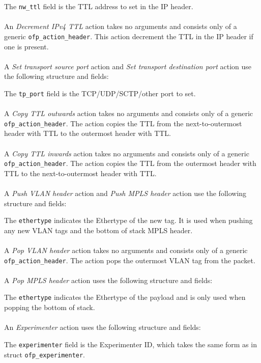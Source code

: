 
The \verb|nw_ttl| field is the TTL address to set in the IP header.
\\\\
An \emph{Decrement IPv4 TTL} action takes no arguments and consists only of a generic \verb|ofp_action_header|.  This action decrement the TTL in the IP header if one is present.
\\\\
A \emph{Set transport source port} action and \emph{Set transport destination port} action use the following structure and fields:


The \verb|tp_port| field is the TCP/UDP/SCTP/other port to set.
\\\\
A \emph{Copy TTL outwards} action takes no arguments and consists only of a generic \verb|ofp_action_header|. The action copies the TTL from the next-to-outermost header with TTL to the outermost header with TTL.
\\\\
A \emph{Copy TTL inwards} action takes no arguments and consists only of a generic \verb|ofp_action_header|. The action copies the TTL from the outermost header with TTL to the next-to-outermost header with TTL.
\\\\
A \emph{Push VLAN header} action and \emph{Push MPLS header} action use the following structure and fields:


The \verb|ethertype| indicates the Ethertype of the new tag. It is used when pushing any new VLAN tags and the bottom of stack MPLS header.
\\\\
A \emph{Pop VLAN header} action takes no arguments and consists only of a generic \verb|ofp_action_header|. The action pops the outermost VLAN tag from the packet.
\\\\
A \emph{Pop MPLS header} action uses the following structure and fields:


The \verb|ethertype| indicates the Ethertype of the payload and is only used when popping the bottom of stack.
\\\\
An \emph{Experimenter} action uses the following structure and fields:


The \verb|experimenter| field is the Experimenter ID, which takes the same form as in struct \verb|ofp_experimenter|.

